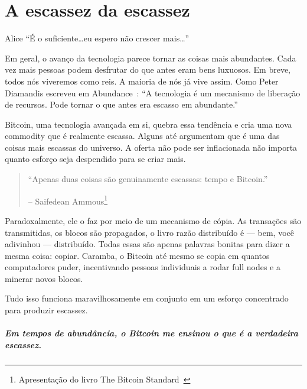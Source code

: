 
\chapter{A escassez da escassez}
\label{les:2}

\begin{chapquote}{Alice}
\enquote{É o suficiente\ldots eu espero não crescer mais\ldots}
\end{chapquote}

Em geral, o avanço da tecnologia parece tornar as coisas mais abundantes. Cada vez mais pessoas podem desfrutar do que antes eram bens luxuosos. Em breve, todos nós viveremos como reis. A maioria de nós já vive assim. Como Peter Diamandis escreveu em Abundance~\cite{abundance}: \enquote{A tecnologia é um mecanismo de liberação de recursos. Pode tornar o que antes era escasso em abundante.}

Bitcoin, uma tecnologia avançada em si, quebra essa tendência e cria uma nova commodity que é realmente escassa. Alguns até argumentam que é uma das coisas mais escassas do universo. A oferta não pode ser inflacionada não importa quanto esforço seja despendido para se criar mais.

\begin{quotation}\begin{samepage}
\enquote{Apenas duas coisas são genuinamente escassas: tempo e Bitcoin.}
\begin{flushright} -- Saifedean Ammous\footnote{Apresentação do livro The Bitcoin Standard~\cite{bitcoinstandard-pres}}
\end{flushright}\end{samepage}\end{quotation}

Paradoxalmente, ele o faz por meio de um mecanismo de cópia. As transações são transmitidas, os blocos são propagados, o livro razão distribuído é --- bem, você adivinhou --- distribuído. Todas essas são apenas palavras bonitas para dizer a mesma coisa: copiar. Caramba, o Bitcoin até mesmo se copia em quantos computadores puder, incentivando pessoas individuais a rodar full nodes e a minerar novos blocos.

Tudo isso funciona maravilhosamente em conjunto em um esforço concentrado para produzir escassez.

\paragraph{Em tempos de abundância, o Bitcoin me ensinou o que é a verdadeira escassez.}

